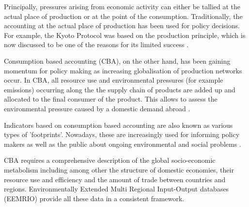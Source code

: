 Principally, pressures arising from economic activity can either be tallied at
the actual place of production or at the point of the consumption.
Traditionally, the accounting at the actual place of production has been used
for policy decisions. For example, the Kyoto Protocol was based on the
production principle, which is now discussed to be one of the reasons for its
limited success \cite{23192129}. 

Consumption based accounting (CBA), on the other hand, has been gaining
momentum for policy making \cite{Harris_2013} as increasing globalisation of production networks occur. In CBA, all resource use and environmental
pressures (for example emissions) occurring along the the supply chain of
products are added up and allocated to the final consumer of the product. This
allows to assess the environmental pressure caused by a domestic
demand abroad \cite{Weinzettel_2013, 20212122}.

Indicators based on consumption based accounting are also known as various
types of 'footprints'. Nowadays, these are increasingly used for informing policy makers as
well as the public about ongoing environmental \cite{tukker_global_2014, steen-olsen_carbon_2012, Kanemoto_2014}\cite{united_nations_university_inclusive_2012}
and social problems \cite{Simas_2014}. 

CBA requires a comprehensive description of the global socio-economic
metabolism including among other the structure of domestic economies, their
resource use and efficiency and the amount of trade between countries and regions.
Environmentally Extended Multi Regional Input-Output databases (EEMRIO) provide
all these data in a consistent framework. 
